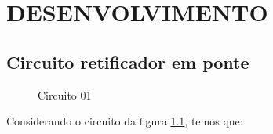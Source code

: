 \chapter{DESENVOLVIMENTO}

\section{Circuito retificador em ponte}

\begin{figure}[H]
    \centering
    \caption{Circuito 01}
    \vspace{-0.3cm}
    \label{fig:Circuito01}
\end{figure}

Considerando o circuito da figura \ref{fig:Circuito01}, temos que:

